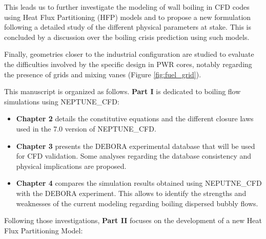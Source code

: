 \npar

This leads us to further investigate the modeling of wall boiling in CFD codes using Heat Flux Partitioning (HFP) models and to propose a new formulation following a detailed study of the different physical parameters at stake. This is concluded by a discussion over the boiling crisis prediction using such models. 

\npar

Finally, geometries closer to the industrial configuration are studied to evaluate the difficulties involved by the specific design in PWR cores, notably regarding the presence of grids and mixing vanes (Figure \ref{fig:fuel_grid}).

\npar

This manuscript is organized as follows. \textbf{Part I} is dedicated to boiling flow simulations using NEPTUNE\_CFD:

\begin{itemize}
\item \textbf{Chapter 2} details the constitutive equations and the different closure laws used in the 7.0 version of NEPTUNE\_CFD. 

\item \textbf{Chapter 3} presents the DEBORA experimental database that will be used for CFD validation. Some analyses regarding the database consistency and physical implications are proposed.

\item \textbf{Chapter 4} compares the simulation results obtained using NEPUTNE\_CFD with the DEBORA experiment. This allows to identify the strengths and weaknesses of the current modeling regarding boiling dispersed bubbly flows.

\end{itemize}


Following those investigations, \textbf{Part II} focuses on the development of a new Heat Flux Partitioning Model:

